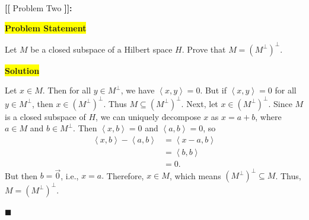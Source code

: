 \documentclass[12pt]{article}
\newcommand{\mybox}{%
    \collectbox{%
        \setlength{\fboxsep}{2pt}%
        \fbox{\BOXCONTENT}%
    }%
}
\begin{document}
\vfill

\begin{center}
\\
\vspace{2mm}
\vspace{-0.65cm}
\hrulefill \\
\vspace{-0.95cm}
\hrulefill
\end{center}

\pagebreak

\noindent \textbf{{\huge [}{\Large [}} Problem Two \textbf{{\Large ]}{\huge ]}}{\Large \textbf{:}}

\vspace{3mm}

\noindent\mybox{\colorbox{yellow}{\textbf{Problem Statement}}}\hspace{3mm}\hrulefill 

\noindent Let $M$ be a closed subspace of a Hilbert space $H$. Prove that $M = \left(M^{\perp}\right)^{\perp}.$

\vspace{5mm}

\noindent\mybox{\colorbox{yellow}{\textbf{Solution}}}\hspace{3mm}\hrulefill

\noindent Let $x\in M.$ Then for all $y\in M^{\perp}$, we have $\left<x,y\right> = 0.$ But if $\left<x,y\right>=0$ for all $y\in M^{\perp}$, then $x\in \left(M^{\perp}\right)^{\perp}.$ Thus $M\subseteq \left(M^{\perp}\right)^{\perp}.$ Next, let $x\in\left(M^{\perp}\right)^{\perp}.$ Since $M$ is a closed subspace of $H$, we can uniquely decompose $x$ as $x = a + b$, where $a\in M$ and $b\in M^{\perp}$. Then $\left<x,b\right> = 0$ and $\left<a,b\right> = 0$, so 
\begin{align}
    \left<x,b\right> - \left<a,b\right> &= \left<x-a,b\right> \\
    &= \left<b,b\right> \\
    &= 0.
\end{align}
But then $b = \vec{0}$, i.e., $x=a.$ Therefore, $x\in M$, which means $\left(M^{\perp}\right)^{\perp}\subseteq M$. Thus, $M = \left(M^{\perp}\right)^{\perp}.$

\hfill$\blacksquare$

\vfill

\begin{center}
\\
\vspace{2mm}
\vspace{-0.65cm}
\hrulefill \\
\vspace{-0.95cm}
\hrulefill
\end{center}
\end{document}
